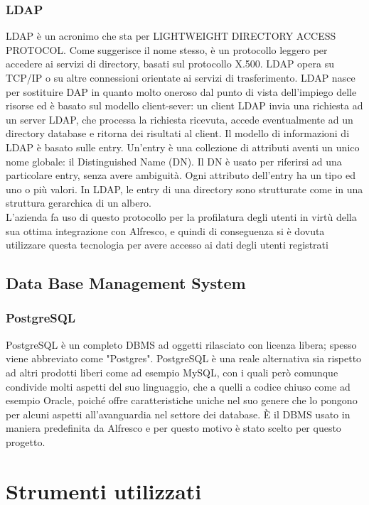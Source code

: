 \subsubsection{LDAP}
LDAP è un acronimo che sta per LIGHTWEIGHT DIRECTORY ACCESS
PROTOCOL. Come suggerisce il nome stesso, è un protocollo leggero per accedere
ai servizi di directory, basati sul protocollo X.500. LDAP opera su TCP/IP o su altre
connessioni orientate ai servizi di trasferimento. LDAP nasce per sostituire DAP in
quanto molto oneroso dal punto di vista dell’impiego delle risorse ed è basato
sul modello client-sever: un client LDAP invia una richiesta ad un server LDAP, che
processa la richiesta ricevuta, accede eventualmente ad un directory database e ritorna
dei risultati al client.
Il modello di informazioni di LDAP è basato sulle entry. Un’entry è una collezione di
attributi aventi un unico nome globale: il Distinguished Name (DN). Il DN è usato
per riferirsi ad una particolare entry, senza avere ambiguità.
Ogni attributo dell’entry ha un tipo ed uno o più valori.
In LDAP, le entry di una directory sono strutturate come in una struttura gerarchica
di un albero.\\
L'azienda fa uso di questo protocollo per la profilatura degli utenti in virtù della sua ottima integrazione con Alfresco, e quindi di conseguenza si è dovuta utilizzare questa tecnologia per avere accesso ai dati degli utenti registrati
\subsection{Data Base Management System}
\subsubsection{PostgreSQL}
PostgreSQL  è un completo DBMS ad oggetti rilasciato con licenza libera; spesso viene abbreviato come "Postgres".
PostgreSQL è una reale alternativa sia rispetto ad altri prodotti liberi come ad esempio MySQL, con i quali però comunque condivide molti aspetti del suo linguaggio, che a quelli a codice chiuso come ad esempio Oracle, poiché offre caratteristiche uniche nel suo genere che lo pongono per alcuni aspetti all'avanguardia nel settore dei database. È il DBMS usato in maniera predefinita da Alfresco e per questo motivo è stato scelto per questo progetto.
\section{Strumenti utilizzati}
